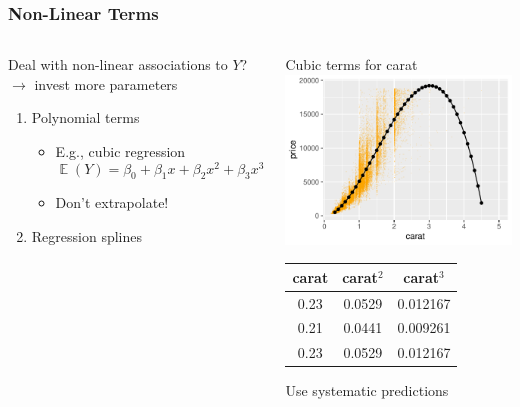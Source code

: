 \documentclass[
    utf8,
    aspectratio=169
]{beamer}  %
\DeclareMathOperator{\E}{\mathbb{E}}  %
\begin{document}
\begin{frame}
	\frametitle{Non-Linear Terms}
	\begin{columns}
		\begin{block}{Deal with non-linear associations to $Y$?} $\rightarrow$ invest more parameters
		\begin{enumerate}
			\item Polynomial terms
			\begin{itemize}
				\item E.g., cubic regression
				$$
					\E(Y) = \beta_0 + \beta_1 x + \beta_2 x^2 + \beta_3 x^3
				$$
				\item Don't extrapolate!
			\end{itemize}
			\item Regression splines
		\end{enumerate}
		\end{block}
		
		\begin{block}{\centering Cubic terms for carat}
			\includegraphics[width=1\textwidth]{pics/nonlinear.pdf}
			\vspace{-9em}
			\begin{scriptsize}
				\begin{table}
					\raggedleft
					\begin{tabular}{ccc}
						carat & carat$^2$ & carat$^3$ \\
								\hline
						 0.23       &            0.0529       &          0.012167\\
						 0.21       &            0.0441       &          0.009261\\
						 0.23       &            0.0529       &          0.012167\\
					\hline
					\end{tabular}
				\end{table}
			\end{scriptsize}
			\vspace{3em}
			\centering Use systematic predictions
		\end{block}
	\end{columns}
\end{frame}
\end{document}
